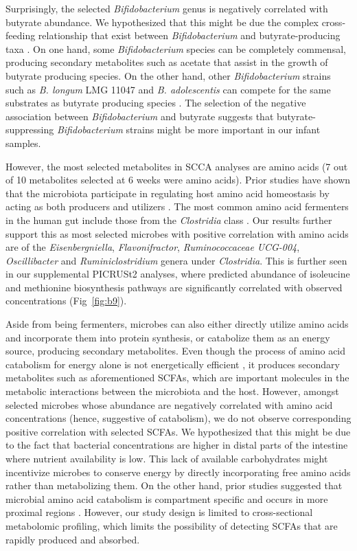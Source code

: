 Surprisingly, the selected \emph{Bifidobacterium} genus is negatively correlated with butyrate abundance. We hypothesized that this might be due the complex cross-feeding relationship that exist between \emph{Bifidobacterium} and butyrate-producing taxa \cite{riviere2016bifidobacteria}. On one hand, some \emph{Bifidobacterium} species can be completely commensal, producing secondary metabolites such as acetate that assist in the growth of butyrate producing species. On the other hand, other \emph{Bifidobacterium} strains such as \emph{B. longum} LMG 11047 and \emph{B. adolescentis} can compete for the same substrates as butyrate producing species \cite{moens2016bifidobacterial}. The selection of the negative association between \emph{Bifidobacterium} and butyrate suggests that butyrate-suppressing \emph{Bifidobacterium} strains might be more important in our infant samples. 

However, the most selected metabolites in SCCA analyses are amino acids (7 out of 10 metabolites selected at 6 weeks were amino acids). Prior studies have shown that the microbiota participate in regulating host amino acid homeostasis by acting as both producers and utilizers \cite{neis2015role}. The most common amino acid fermenters in the human gut include those from the \emph{Clostridia} class \cite{dai2011amino}. Our results further support this as most selected microbes with positive correlation with amino acids are of the \emph{Eisenbergniella}, \emph{Flavonifractor}, \emph{Ruminococcaceae UCG-004}, \emph{Oscillibacter} and \emph{Ruminiclostridium} genera under \emph{Clostridia}. This is further seen in our supplemental PICRUSt2 analyses, where predicted abundance of isoleucine and methionine biosynthesis pathways are significantly correlated with observed concentrations (Fig~\ref{fig:b9}). 

Aside from being fermenters, microbes can also either directly utilize amino acids and incorporate them into protein synthesis, or catabolize them as an energy source, producing secondary metabolites. Even though the process of amino acid catabolism for energy alone is not energetically efficient \cite{oliphant2019macronutrient}, it produces secondary metabolites such as aforementioned SCFAs, which are important molecules in the metabolic interactions between the microbiota and the host. However, amongst selected microbes whose abundance are negatively correlated with amino acid concentrations (hence, suggestive of catabolism), we do not observe corresponding positive correlation with selected SCFAs.  We hypothesized that this might be due to the fact that bacterial concentrations are higher in distal parts of the intestine \cite{ewald2018human, neis2015role} where nutrient availability is low. This lack of available carbohydrates might incentivize microbes to conserve energy by directly incorporating free amino acids rather than metabolizing them. On the other hand, prior studies suggested that microbial amino acid catabolism is compartment specific and occurs in more proximal regions \cite{dai2011amino, macfarlane2012bacteria}. However, our study design is limited to cross-sectional metabolomic profiling, which limits the possibility of detecting SCFAs that are rapidly produced and absorbed.  

